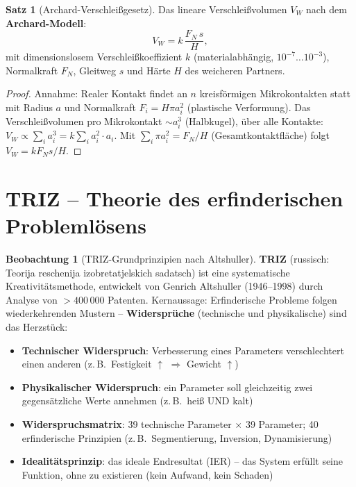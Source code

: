 ﻿\documentclass[a4paper,12pt]{report}
\theoremstyle{definition}
\newtheorem{satz}{Satz}
\newtheorem{beobachtung}{Beobachtung}
\begin{document}
\begin{satz}[Archard-Verschleißgesetz]
Das lineare Verschleißvolumen $V_W$ nach dem \textbf{Archard-Modell}:
\[
  V_W = k\,\frac{F_N\,s}{H},
\]
mit dimensionslosem Verschleißkoeffizient $k$ (materialabhängig,
$10^{-7}\ldots10^{-3}$), Normalkraft $F_N$, Gleitweg $s$ und
Härte $H$ des weicheren Partners.
\end{satz}
\begin{proof}
Annahme: Realer Kontakt findet an $n$ kreisförmigen Mikrokontakten
statt mit Radius $a$ und Normalkraft $F_i = H\pi a_i^2$ (plastische Verformung).
Das Verschleißvolumen pro Mikrokontakt $\sim a_i^3$ (Halbkugel), über alle Kontakte:
$V_W \propto \sum_i a_i^3 = k \sum_i a_i^2 \cdot a_i$.
Mit $\sum_i \pi a_i^2 = F_N/H$ (Gesamtkontaktfläche) folgt $V_W = k F_N s / H$.
\end{proof}


\section{TRIZ -- Theorie des erfinderischen Problemlösens}

\begin{beobachtung}[TRIZ-Grundprinzipien nach Altshuller]
\textbf{TRIZ} (russisch: Teorija reschenija izobretatjelskich sadatsch)
ist eine systematische Kreativitätsmethode, entwickelt von Genrich Altshuller
(1946--1998) durch Analyse von $> 400\,000$ Patenten.
Kernaussage: Erfinderische Probleme folgen wiederkehrenden Mustern --
\textbf{Widersprüche} (technische und physikalische) sind das Herzstück:
\begin{itemize}
    \item[-] \textbf{Technischer Widerspruch}: Verbesserung eines Parameters
          verschlechtert einen anderen (z.\,B.\ Festigkeit $\uparrow$ $\Rightarrow$ Gewicht $\uparrow$)
    \item[-] \textbf{Physikalischer Widerspruch}: ein Parameter soll gleichzeitig
          zwei gegensätzliche Werte annehmen (z.\,B.\ heiß UND kalt)
    \item[-] \textbf{Widerspruchsmatrix}: 39 technische Parameter $\times$ 39 Parameter;
          40 erfinderische Prinzipien (z.\,B.\ Segmentierung, Inversion, Dynamisierung)
    \item[-] \textbf{Idealitätsprinzip}: das ideale Endresultat (IER) --
          das System erfüllt seine Funktion, ohne zu existieren (kein Aufwand, kein Schaden)
\end{itemize}
\end{beobachtung}
\end{document}

